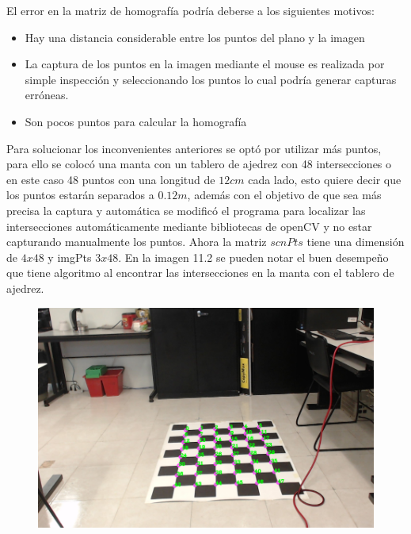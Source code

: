        El error en la matriz de homografía podría deberse a los siguientes motivos:
       \begin{itemize}
       	\item  Hay una distancia considerable entre los puntos del plano y la imagen
       	\item La captura de los puntos en la imagen mediante el mouse es realizada por simple inspección y seleccionando los puntos lo cual podría generar capturas erróneas.
       	\item Son pocos puntos para calcular la homografía
       \end{itemize}
       Para solucionar los inconvenientes anteriores se optó por utilizar más puntos, para ello se colocó una manta con un tablero de ajedrez con 48 intersecciones o en este caso 48 puntos con una longitud de $12cm$ cada lado, esto quiere decir que los puntos estarán separados a $0.12m$, además con el objetivo de que sea más precisa la captura y automática se modificó el programa para localizar las intersecciones automáticamente mediante bibliotecas de openCV y no estar capturando manualmente los puntos. Ahora la matriz $scnPts$ tiene una dimensión de $4x48$ y imgPts $3x48$. En la imagen 11.2 se pueden notar el buen desempeño que tiene algoritmo al encontrar las intersecciones en la manta con el tablero de ajedrez.
       \begin{figure}[htbp]
       	\centering
       	\includegraphics[width=.6\textwidth]{./pictures/ajedrez}
       	\caption{}\label{fig: figura}
       \end{figure}
       
